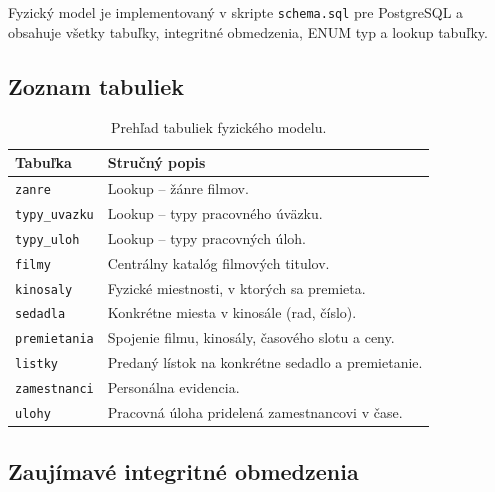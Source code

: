 \documentclass[11pt, a4paper]{article}
\begin{document}
Fyzický model je implementovaný v skripte \texttt{schema.sql} pre PostgreSQL
a obsahuje všetky tabuľky, integritné obmedzenia, ENUM typ a lookup tabuľky.

\subsection{Zoznam tabuliek}

\begin{table}[H]
    \centering
    \begin{tabular}{l p{9.5cm}}
        \toprule
        \textbf{Tabuľka} & \textbf{Stručný popis} \\
        \midrule
        \texttt{zanre}        & Lookup -- žánre filmov. \\
        \texttt{typy\_uvazku} & Lookup -- typy pracovného úväzku. \\
        \texttt{typy\_uloh}   & Lookup -- typy pracovných úloh. \\
        \texttt{filmy}        & Centrálny katalóg filmových titulov. \\
        \texttt{kinosaly}     & Fyzické miestnosti, v ktorých sa premieta. \\
        \texttt{sedadla}      & Konkrétne miesta v kinosále (rad, číslo). \\
        \texttt{premietania}  & Spojenie filmu, kinosály, časového slotu a ceny. \\
        \texttt{listky}       & Predaný lístok na konkrétne sedadlo a premietanie. \\
        \texttt{zamestnanci}  & Personálna evidencia. \\
        \texttt{ulohy}        & Pracovná úloha pridelená zamestnancovi v čase. \\
        \bottomrule
    \end{tabular}
    \caption{Prehľad tabuliek fyzického modelu.}
\end{table}

\subsection{Zaujímavé integritné obmedzenia}
\end{document}
